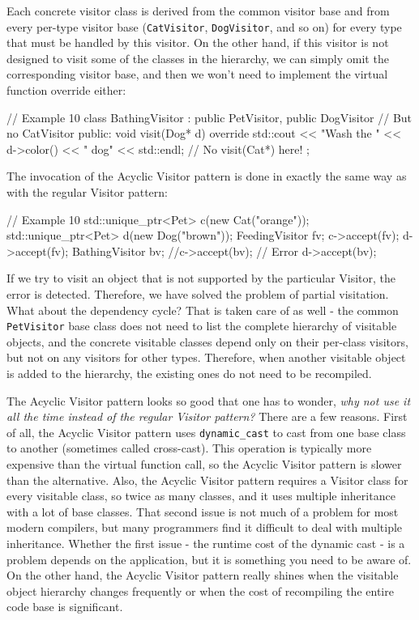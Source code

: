 Each concrete visitor class is derived from the common visitor base and from every per-type visitor base (\texttt{CatVisitor}, \texttt{DogVisitor}, and so on) for every type that must be handled by this visitor. On the other hand, if this visitor is not designed to visit some of the classes in the hierarchy, we can simply omit the corresponding visitor base, and then we won't need to implement the virtual function override either:

\begin{code}
// Example 10
class BathingVisitor : public PetVisitor,
                       public DogVisitor
                       { // But no CatVisitor
  public:
  void visit(Dog* d) override {
    std::cout << "Wash the " << d->color()
              << " dog" << std::endl;
  }
  // No visit(Cat*) here!
};
\end{code}

The invocation of the Acyclic Visitor pattern is done in exactly the same way as with the regular Visitor pattern:

\begin{code}
// Example 10
std::unique_ptr<Pet> c(new Cat("orange"));
std::unique_ptr<Pet> d(new Dog("brown"));
FeedingVisitor fv;
c->accept(fv);
d->accept(fv);
BathingVisitor bv;
//c->accept(bv); // Error
d->accept(bv);
\end{code}

If we try to visit an object that is not supported by the particular Visitor, the error is detected. Therefore, we have solved the problem of partial visitation. What about the dependency cycle? That is taken care of as well - the common \texttt{PetVisitor} base class does not need to list the complete hierarchy of visitable objects, and the concrete visitable classes depend only on their per-class visitors, but not on any visitors for other types. Therefore, when another visitable object is added to the hierarchy, the existing ones do not need to be recompiled.

The Acyclic Visitor pattern looks so good that one has to wonder, \emph{why not use it all the time instead of the regular Visitor pattern?} There are a few reasons. First of all, the Acyclic Visitor pattern uses \texttt{dynamic\_cast} to cast from one base class to another (sometimes called cross-cast). This operation is typically more expensive than the virtual function call, so the Acyclic Visitor pattern is slower than the alternative. Also, the Acyclic Visitor pattern requires a Visitor class for every visitable class, so twice as many classes, and it uses multiple inheritance with a lot of base classes. That second issue is not much of a problem for most modern compilers, but many programmers find it difficult to deal with multiple inheritance. Whether the first issue - the runtime cost of the dynamic cast - is a problem depends on the application, but it is something you need to be aware of. On the other hand, the Acyclic Visitor pattern really shines when the visitable object hierarchy changes frequently or when the cost of recompiling the entire code base is significant.

